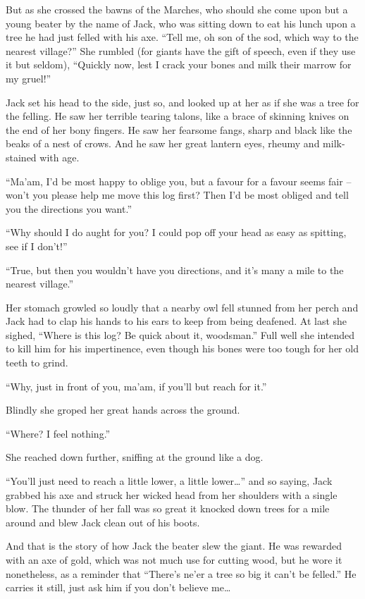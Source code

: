 But as she crossed the bawns of the Marches, who should she come upon but a young beater by the name of Jack, who was sitting down to eat his lunch upon a tree he had just felled with his axe. “Tell me, oh son of the sod, which way to the nearest village?” She rumbled (for giants have the gift of speech, even if they use it but seldom), “Quickly now, lest I crack your bones and milk their marrow for my gruel!”

Jack set his head to the side, just so, and looked up at her as if she was a tree for the felling. He saw her terrible tearing talons, like a brace of skinning knives on the end of her bony fingers. He saw her fearsome fangs, sharp and black like the beaks of a nest of crows. And he saw her great lantern eyes, rheumy and milk-stained with age.

“Ma’am, I’d be most happy to oblige you, but a favour for a favour seems fair – won’t you please help me move this log first? Then I’d be most obliged and tell you the directions you want.”

“Why should I do aught for you? I could pop off your head as easy as spitting, see if I don’t!”

“True, but then you wouldn’t have you directions, and it’s many a mile to the nearest village.”

Her stomach growled so loudly that a nearby owl fell stunned from her perch and Jack had to clap his hands to his ears to keep from being deafened. At last she sighed, “Where is this log? Be quick about it, woodsman.” Full well she intended to kill him for his impertinence, even though his bones were too tough for her old teeth to grind.

“Why, just in front of you, ma’am, if you’ll but reach for it.”

Blindly she groped her great hands across the ground.

“Where? I feel nothing.”

She reached down further, sniffing at the ground like a dog.

“You’ll just need to reach a little lower, a little lower…” and so saying, Jack grabbed his axe and struck her wicked head from her shoulders with a single blow. The thunder of her fall was so great it knocked down trees for a mile around and blew Jack clean out of his boots.

And that is the story of how Jack the beater slew the giant. He was rewarded with an axe of gold, which was not much use for cutting wood, but he wore it nonetheless, as a reminder that “There’s ne’er a tree so big it can’t be felled.” He carries it still, just ask him if you don’t believe me… 

